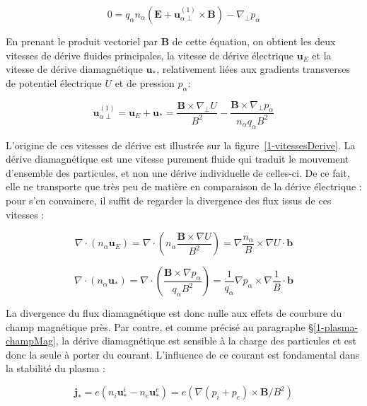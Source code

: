 \begin{refsection}
 \begin{equation}
\label{1-eqSOLperp}
0
={q_\alpha n_\alpha}\left(\mathbf E+\mathbf
u_{\alpha\perp}^{(1)}\times \mathbf B\right)
-{\nabla_\perp p_\alpha}
\end{equation}

En prenant le produit vectoriel par $\mathbf B$ de cette équation, on obtient
les deux vitesses de dérive fluides principales, la vitesse de dérive électrique
$\mathbf u_E$ et la vitesse de dérive diamagnétique $\mathbf u_*$, relativement
liées aux gradients transverses de potentiel électrique $U$ et de pression
$p_\alpha$:

\begin{equation}
\mathbf u_{\alpha\perp}^{(1)}=\mathbf u_E+\mathbf u_*=\frac{\mathbf
B\times\nabla_\perp U}{B^2}-\frac{\mathbf B\times\nabla_\perp p_\alpha}{n_\alpha q_\alpha B^2}
\end{equation}

L'origine de ces vitesses de dérive est illustrée sur la
figure~\ref{1-vitessesDerive}. La dérive diamagnétique est une vitesse
purement fluide qui traduit le mouvement d'ensemble des particules, et non
une dérive individuelle de celles-ci. De ce fait, elle ne transporte que
très peu de matière en comparaison de la dérive électrique : pour s'en
convaincre, il suffit de regarder la divergence des flux issus de ces
vitesses :

\begin{equation}
\nabla\cdot\left(n_\alpha\mathbf
u_E\right)=\nabla\cdot\left(n_\alpha\frac{\mathbf B\times\nabla U}{B^2}\right)
=\nabla\frac{n_\alpha}{B}\times\nabla U\cdot \mathbf b
\end{equation}

\begin{equation}
\nabla\cdot\left(n_\alpha\mathbf
u_*\right)=\nabla\cdot\left(\frac{\mathbf B\times\nabla
p_\alpha}{q_\alpha B^2}\right)
=\frac{1}{q_\alpha}\nabla p_\alpha\times\nabla\frac{1}{B}\cdot \mathbf b
\end{equation}

La divergence du flux diamagnétique est donc nulle aux effets de courbure du
champ magnétique près. Par contre, et comme
précisé au paragraphe \S\ref{1-plasma-champMag}, la dérive diamagnétique est 
sensible à la charge des particules et est donc la seule à porter du courant.
L'influence de ce courant est fondamental dans la stabilité du plasma :

\begin{equation}
\mathbf j_*=e(n_i\mathbf u^i_*-n_e\mathbf
u^e_*)=e(\nabla(p_i+p_e)\times\mathbf B/B^2)
\end{equation}


\end{refsection}
